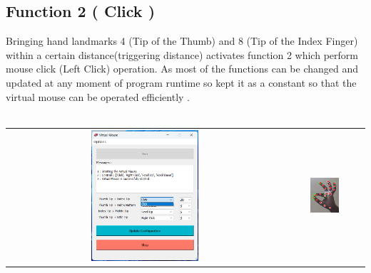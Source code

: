 \documentclass[12pt,a4paper]{report}
\begin{document}
		\subsection{Function 2 ( Click )}	Bringing hand landmarks 4 (Tip of the Thumb) and 8 (Tip of the Index Finger) within a certain distance(triggering distance) activates function 2 which perform mouse click (Left Click) operation. As most of the functions can be changed and updated at any moment of program runtime so kept it as a constant so that the virtual mouse can be operated efficiently .  
	\\ \\
		    \begin{tabular}{c c}
 \includegraphics[width=0.4\textwidth]{action2f}&
 \includegraphics[width=0.4\textwidth]{action2} 
    \end{tabular}
    		\label{Function 3 ( Selectable )}
\end{document}
